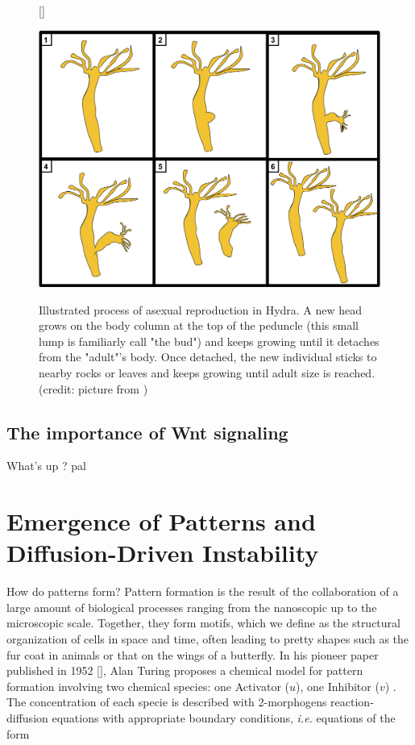 \begin{figure}[h]
	[\FBwidth]
	{\caption{Illustrated process of asexual reproduction in Hydra. A new head grows on the body column at the top of the peduncle (this small lump is familiarly call "the bud") and keeps growing until it detaches from the "adult"'s body. Once detached, the new individual sticks to nearby rocks or leaves and keeps growing until adult size is reached. (credit: picture from \cite{Neupane2022})}\label{fig:test}}
	{\includegraphics[width=0.9\linewidth]{figures/hydra_asexual.png}}
\end{figure}


  

\subsection{The importance of Wnt signaling}

What's up ? pal

\section{Emergence of Patterns and Diffusion-Driven Instability}
How do patterns form? Pattern formation is the result of the collaboration of a large amount of biological processes ranging from the nanoscopic up to the microscopic scale. Together, they form motifs, which we define as the structural organization of cells in space and time, often leading to pretty shapes such as the fur coat in animals or that on the wings of a butterfly. In his pioneer paper  published in 1952 [], Alan Turing proposes a chemical model for pattern formation involving two chemical species: one Activator ($u$), one Inhibitor ($v$) . The concentration of each specie is described with 2-morphogens reaction-diffusion equations with appropriate boundary conditions, \textit{i.e.} equations of the form 


